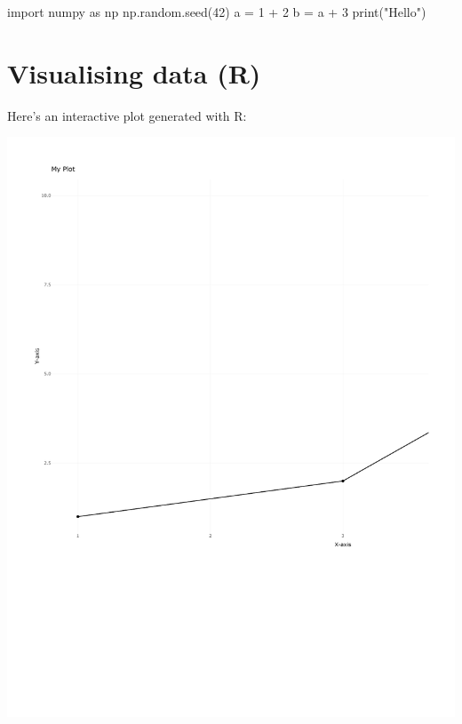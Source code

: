 \documentclass[
  letterpaper,
  DIV=11,
  numbers=noendperiod]{scrreprt}
\newenvironment{Shaded}{\begin{snugshade}}{\end{snugshade}}
\newcommand{\BuiltInTok}[1]{\textcolor[rgb]{0.00,0.23,0.31}{#1}}
\newcommand{\DecValTok}[1]{\textcolor[rgb]{0.68,0.00,0.00}{#1}}
\newcommand{\ImportTok}[1]{\textcolor[rgb]{0.00,0.46,0.62}{#1}}
\newcommand{\NormalTok}[1]{\textcolor[rgb]{0.00,0.23,0.31}{#1}}
\newcommand{\OperatorTok}[1]{\textcolor[rgb]{0.37,0.37,0.37}{#1}}
\newcommand{\StringTok}[1]{\textcolor[rgb]{0.13,0.47,0.30}{#1}}
\theoremstyle{definition}
\theoremstyle{remark}
\begin{document}
\begin{Shaded}
\begin{Highlighting}[]
\ImportTok{import}\NormalTok{ numpy }\ImportTok{as}\NormalTok{ np}
\NormalTok{np.random.seed(}\DecValTok{42}\NormalTok{)}
\NormalTok{a }\OperatorTok{=} \DecValTok{1} \OperatorTok{+} \DecValTok{2}
\NormalTok{b }\OperatorTok{=}\NormalTok{ a }\OperatorTok{+} \DecValTok{3}
\BuiltInTok{print}\NormalTok{(}\StringTok{"Hello"}\NormalTok{)}
\end{Highlighting}
\end{Shaded}

\section{Visualising data (R)}\label{visualising-data-r}

Here's an interactive plot generated with R:

\includegraphics{intro_files/figure-pdf/unnamed-chunk-1-1.pdf}
\end{document}
